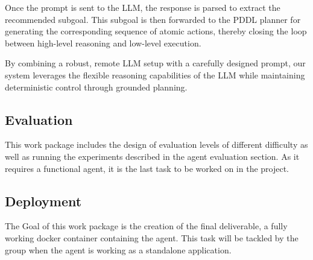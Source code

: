 \documentclass{article}
\begin{document}
Once the prompt is sent to the LLM, the response is parsed to extract the recommended subgoal. This subgoal is then forwarded to the PDDL planner for generating the corresponding sequence of atomic actions, thereby closing the loop between high-level reasoning and low-level execution.

By combining a robust, remote LLM setup with a carefully designed prompt, our system leverages the flexible reasoning capabilities of the LLM while maintaining deterministic control through grounded planning.



\subsection{Evaluation}
This work package includes the design of evaluation levels of different difficulty as well as running the experiments described in the agent evaluation section. As it requires a functional agent, it is the last task to be worked on in the project.

\subsection{Deployment}
The Goal of this work package is the creation of the final deliverable, a fully working docker container containing the agent. 
This task will be tackled by the group when the agent is working as a standalone application.
\end{document}
